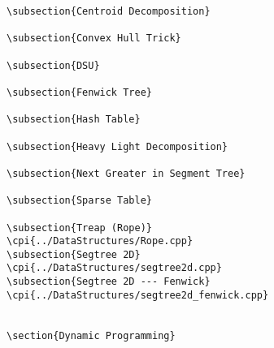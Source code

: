 {\begin{verbatim}
\subsection{Centroid Decomposition}

\subsection{Convex Hull Trick}

\subsection{DSU}

\subsection{Fenwick Tree}

\subsection{Hash Table}

\subsection{Heavy Light Decomposition}

\subsection{Next Greater in Segment Tree}

\subsection{Sparse Table}

\subsection{Treap (Rope)}
\cpi{../DataStructures/Rope.cpp}
\subsection{Segtree 2D}
\cpi{../DataStructures/segtree2d.cpp}
\subsection{Segtree 2D --- Fenwick}
\cpi{../DataStructures/segtree2d_fenwick.cpp}


\section{Dynamic Programming}


\end{verbatim}}
